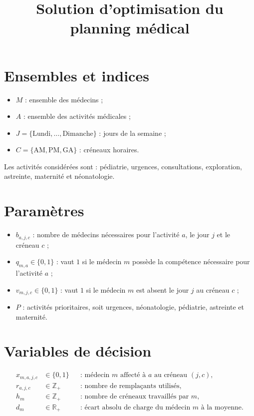 \documentclass[11pt,a4paper]{article}
\title{Solution d'optimisation du planning médical}
\author{}
\date{}
\begin{document}
\maketitle

\section{Ensembles et indices}

\begin{itemize}[leftmargin=*]
    \item $M$ : ensemble des médecins ;
    \item $A$ : ensemble des activités médicales ;
    \item $J = \{\text{Lundi},\ldots,\text{Dimanche}\}$ : jours de la semaine ;
    \item $C = \{\mathrm{AM},\mathrm{PM},\mathrm{GA}\}$ : créneaux horaires.
\end{itemize}

Les activités considérées sont : pédiatrie, urgences, consultations,
exploration, astreinte, maternité et néonatologie.

\section{Paramètres}

\begin{itemize}[leftmargin=*]
    \item $b_{a,j,c}$ : nombre de médecins nécessaires pour l'activité $a$,
    le jour $j$ et le créneau $c$ ;
    \item $q_{m,a} \in \{0,1\}$ : vaut $1$ si le médecin $m$ possède la
    compétence nécessaire pour l'activité $a$ ;
    \item $v_{m,j,c} \in \{0,1\}$ : vaut $1$ si le médecin $m$ est absent
    le jour $j$ au créneau $c$ ;
    \item $P$ : activités prioritaires, soit urgences, néonatologie,
    pédiatrie, astreinte et maternité.
\end{itemize}

\section{Variables de décision}

\begin{align*}
    x_{m,a,j,c} &\in \{0,1\} &&\text{: médecin $m$ affecté à $a$ au créneau $(j,c)$},\\
    r_{a,j,c} &\in \mathbb{Z}_{+} &&\text{: nombre de remplaçants utilisés},\\
    h_m &\in \mathbb{Z}_{+} &&\text{: nombre de créneaux travaillés par $m$},\\
    d_m &\in \mathbb{R}_{+} &&\text{: écart absolu de charge du médecin $m$ à la moyenne}.
\end{align*}
\end{document}
